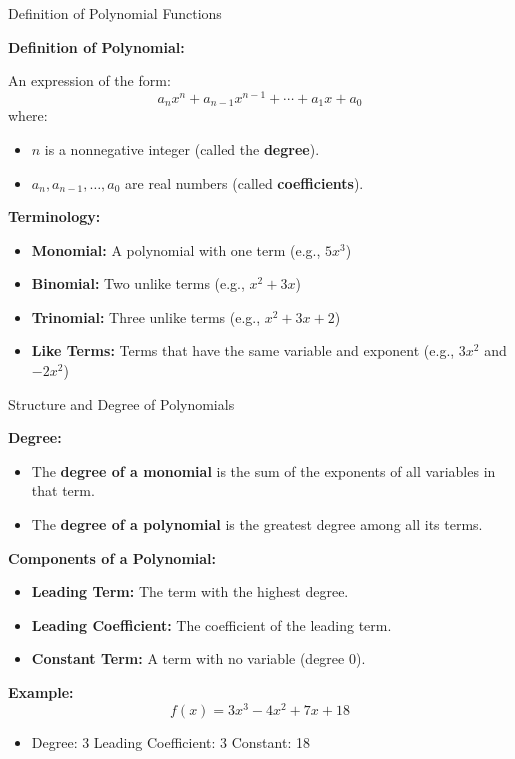 \documentclass{beamer}
\begin{document}





\begin{frame}{Definition of Polynomial Functions}
\small

\textbf{Definition of Polynomial:}

An expression of the form:
\[
a_nx^n + a_{n-1}x^{n-1} + \cdots + a_1x + a_0
\]
where:
\begin{itemize}
    \item $n$ is a nonnegative integer (called the \textbf{degree}).
    \item $a_n, a_{n-1}, \ldots, a_0$ are real numbers (called \textbf{coefficients}).
\end{itemize}

\vspace{0.3cm}
\textbf{Terminology:}
\begin{itemize}
    \item \textbf{Monomial:} A polynomial with one term (e.g., $5x^3$)
    \item \textbf{Binomial:} Two unlike terms (e.g., $x^2 + 3x$)
    \item \textbf{Trinomial:} Three unlike terms (e.g., $x^2 + 3x + 2$)
    \item \textbf{Like Terms:} Terms that have the same variable and exponent (e.g., $3x^2$ and $-2x^2$)
\end{itemize}



\end{frame}

\begin{frame}{Structure and Degree of Polynomials}
\small

\textbf{Degree:}
\begin{itemize}
    \item The \textbf{degree of a monomial} is the sum of the exponents of all variables in that term.
    \item The \textbf{degree of a polynomial} is the greatest degree among all its terms.
\end{itemize}

\vspace{0.3cm}
\textbf{Components of a Polynomial:}
\begin{itemize}
    \item \textbf{Leading Term:} The term with the highest degree.
    \item \textbf{Leading Coefficient:} The coefficient of the leading term.
    \item \textbf{Constant Term:} A term with no variable (degree 0).
\end{itemize}

\vspace{0.3cm}
\textbf{Example:}
\[
f(x) = 3x^3 - 4x^2 + 7x + 18
\]
\begin{itemize}
    \item Degree: 3 \quad Leading Coefficient: 3 \quad Constant: 18
\end{itemize}

\end{frame}
\end{document}
